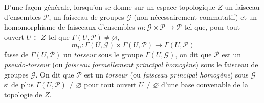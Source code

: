 \begin{env}[16.5.15]
D'une façon générale, lorsqu'on se donne sur un espace topologique $Z$ un
faisceau d'ensembles $\mathscr{P}$, un faisceau de groupes $\mathscr{G}$ (non
nécessairement commutatif) et un homomorphisme de faisceaux d'ensembles
$m:\mathscr{G}\times\mathscr{P}\to\mathscr{P}$ tel que, pour tout ouvert
$U\subset Z$ tel que $\Gamma(U,\mathscr{P})\neq\varnothing$,
\[
  m_U:\Gamma(U,\mathscr{G})\times\Gamma(U,\mathscr{P})
  \longrightarrow\Gamma(U,\mathscr{P})
\]
fasse de $\Gamma(U,\mathscr{P})$ un \emph{torseur} sous le groupe
$\Gamma(U,\mathscr{G})$, on dit que $\mathscr{P}$ est un
\emph{pseudo-torseur} (ou \emph{faisceau formellement principal homogène})
sous le faisceau de groupes $\mathscr{G}$. On dit que $\mathscr{P}$ est un
\emph{torseur} (ou \emph{faisceau principal homogène}) sous $\mathscr{G}$ si
de plus $\Gamma(U,\mathscr{P})\neq\varnothing$ pour tout ouvert
$U\neq\varnothing$ d'une base convenable de la topologie de $Z$.


\end{env}
